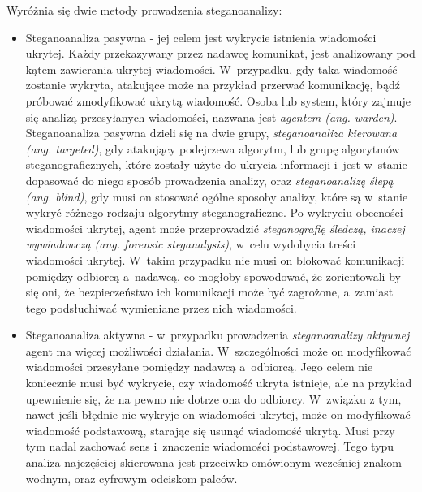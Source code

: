 \documentclass[a4paper, twoside, openright, 12pt]{report}
\begin{document}
        Wyróżnia się dwie metody prowadzenia steganoanalizy:
        \begin{itemize}
            \item Steganoanaliza pasywna - jej celem jest wykrycie istnienia wiadomości ukrytej.
                Każdy przekazywany
        przez nadawcę komunikat, jest analizowany pod kątem zawierania ukrytej wiadomości.
        W~przypadku, gdy taka wiadomość zostanie wykryta, atakujące może na przykład przerwać komunikację,
        bądź próbować zmodyfikować ukrytą wiadomość.
        Osoba lub system,
        który zajmuje się analizą przesyłanych wiadomości, nazwana jest \emph{agentem (ang. warden)}.
        Steganoanaliza pasywna dzieli się na dwie grupy, \emph{steganoanaliza kierowana (ang. targeted)}, gdy
        atakujący podejrzewa algorytm, lub grupę algorytmów steganograficznych,
        które zostały użyte do ukrycia informacji i~jest w~stanie dopasować do
        niego sposób prowadzenia analizy, oraz \emph{steganoanalizę ślepą (ang. blind)},
        gdy musi on stosować ogólne sposoby analizy, które są w~stanie wykryć różnego
        rodzaju algorytmy steganograficzne. Po wykryciu obecności wiadomości ukrytej,
        agent może przeprowadzić \emph{steganografię śledczą, inaczej wywiadowczą (ang. forensic steganalysis)},
        w~celu wydobycia treści wiadomości ukrytej. W~takim przypadku nie musi on
        blokować komunikacji pomiędzy odbiorcą a~nadawcą, co mogłoby spowodować,
        że zorientowali by się oni, że bezpieczeństwo ich komunikacji może być zagrożone,
        a~zamiast tego podsłuchiwać wymieniane przez nich wiadomości.

            \item Steganoanaliza aktywna - w~przypadku prowadzenia \emph{steganoanalizy aktywnej} agent ma więcej możliwości
        działania. W~szczególności może on modyfikować wiadomości przesyłane pomiędzy
        nadawcą a~odbiorcą. Jego celem nie koniecznie musi być wykrycie, czy wiadomość
        ukryta istnieje, ale na przykład upewnienie się, że na pewno nie dotrze ona
        do odbiorcy. W~związku z tym, nawet jeśli błędnie nie wykryje on wiadomości ukrytej,
        może on modyfikować wiadomość podstawową, starając się usunąć wiadomość ukrytą.
        Musi przy tym  nadal zachować sens i~znaczenie wiadomości podstawowej. Tego typu analiza
        najczęściej skierowana jest przeciwko omówionym wcześniej znakom wodnym,
        oraz cyfrowym odciskom palców\cite[Rozdział 13]{DIGITALWATERMARKING}.
    \end{itemize}
\end{document}
